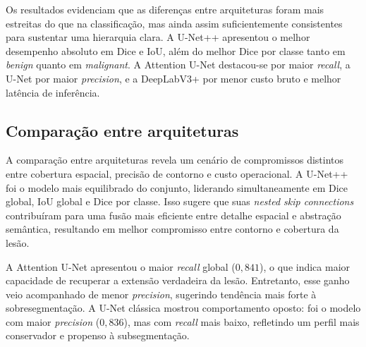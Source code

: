 \documentclass[tcc,capa]{texufpel}
\begin{document}
\begin{table}[htbp]
	\centering
	\caption{Resultados consolidados dos modelos de segmentação no conjunto de teste.}
	\label{tab:segmentation_results_final}
\end{table}

Os resultados evidenciam que as diferenças entre arquiteturas foram mais estreitas do que na classificação, mas ainda assim suficientemente consistentes para sustentar uma hierarquia clara. A U-Net++ apresentou o melhor desempenho absoluto em Dice e IoU, além do melhor Dice por classe tanto em \textit{benign} quanto em \textit{malignant}. A Attention U-Net destacou-se por maior \textit{recall}, a U-Net por maior \textit{precision}, e a DeepLabV3+ por menor custo bruto e melhor latência de inferência.

\subsection{Comparação entre arquiteturas}

A comparação entre arquiteturas revela um cenário de compromissos distintos entre cobertura espacial, precisão de contorno e custo operacional. A U-Net++ foi o modelo mais equilibrado do conjunto, liderando simultaneamente em Dice global, IoU global e Dice por classe. Isso sugere que suas \textit{nested skip connections} contribuíram para uma fusão mais eficiente entre detalhe espacial e abstração semântica, resultando em melhor compromisso entre contorno e cobertura da lesão.

A Attention U-Net apresentou o maior \textit{recall} global (\(0{,}841\)), o que indica maior capacidade de recuperar a extensão verdadeira da lesão. Entretanto, esse ganho veio acompanhado de menor \textit{precision}, sugerindo tendência mais forte à sobresegmentação. A U-Net clássica mostrou comportamento oposto: foi o modelo com maior \textit{precision} (\(0{,}836\)), mas com \textit{recall} mais baixo, refletindo um perfil mais conservador e propenso à subsegmentação.
\end{document}
